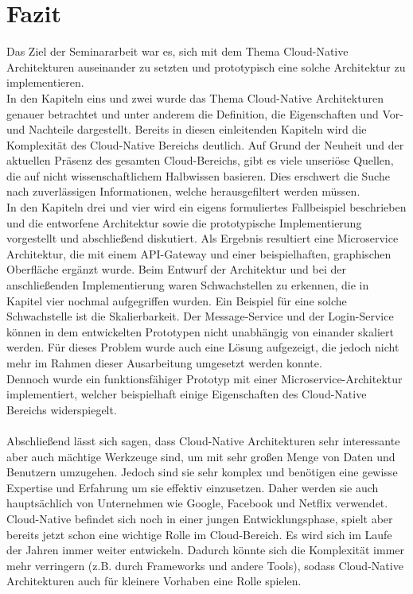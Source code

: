 \chapter{Fazit}
Das Ziel der Seminararbeit war es, sich mit dem Thema Cloud-Native Architekturen auseinander zu setzten und prototypisch eine solche Architektur zu implementieren.\\
In den Kapiteln eins und zwei wurde das Thema Cloud-Native Architekturen genauer betrachtet und unter anderem die Definition, die Eigenschaften und Vor-und Nachteile dargestellt. Bereits in diesen einleitenden Kapiteln wird die Komplexität des Cloud-Native Bereichs deutlich. Auf Grund der Neuheit und der aktuellen Präsenz des gesamten Cloud-Bereichs, gibt es viele unseriöse Quellen, die auf nicht wissenschaftlichem Halbwissen basieren. Dies erschwert die Suche nach zuverlässigen Informationen, welche herausgefiltert werden müssen.\\
In den Kapiteln drei und vier wird ein eigens formuliertes Fallbeispiel beschrieben und die entworfene Architektur sowie die prototypische Implementierung vorgestellt und abschließend diskutiert. Als Ergebnis resultiert eine Microservice Architektur, die mit einem API-Gateway und einer beispielhaften, graphischen Oberfläche ergänzt wurde. Beim Entwurf der Architektur und bei der anschließenden Implementierung waren Schwachstellen zu erkennen, die in Kapitel vier nochmal aufgegriffen wurden. Ein Beispiel für eine solche Schwachstelle ist die Skalierbarkeit. Der Message-Service und der Login-Service können in dem entwickelten Prototypen nicht unabhängig von einander skaliert werden. Für dieses Problem wurde auch eine Lösung aufgezeigt, die jedoch nicht mehr im Rahmen dieser Ausarbeitung umgesetzt werden konnte.\\
Dennoch wurde ein funktionsfähiger Prototyp mit einer Microservice-Architektur implementiert, welcher beispielhaft einige Eigenschaften des Cloud-Native Bereichs widerspiegelt.\\
\\
Abschließend lässt sich sagen, dass Cloud-Native Architekturen sehr interessante aber auch mächtige Werkzeuge sind, um mit sehr großen Menge von Daten und Benutzern umzugehen. Jedoch sind sie sehr komplex und benötigen eine gewisse Expertise und Erfahrung um sie effektiv einzusetzen. Daher werden sie auch hauptsächlich von Unternehmen wie Google, Facebook und Netflix verwendet.\\
Cloud-Native befindet sich noch in einer jungen Entwicklungsphase, spielt aber bereits jetzt schon eine wichtige Rolle im Cloud-Bereich. Es wird sich im Laufe der Jahren immer weiter entwickeln. Dadurch könnte sich die Komplexität immer mehr verringern (z.B. durch Frameworks und andere Tools), sodass Cloud-Native Architekturen auch für kleinere Vorhaben eine Rolle spielen.
